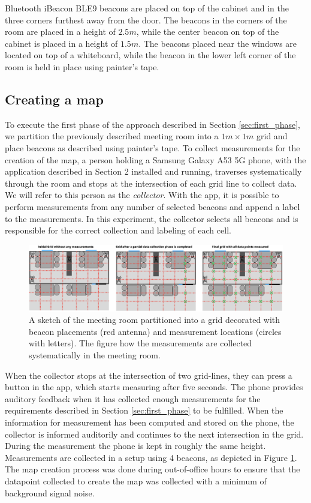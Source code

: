 Bluetooth iBeacon BLE9 beacons \cite{BluetoothiBeaconBLE9} are placed on top of the cabinet and in the three corners furthest away from the door. 
The beacons in the corners of the room are placed in a height of $2.5m$, while the center beacon on top of the cabinet is placed in a height of $1.5m$.   
The beacons placed near the windows are located on top of a whiteboard, while the beacon in the lower left corner of the room is held in place using painter's tape. 


\subsection{Creating a map}
To execute the first phase of the approach described in Section \ref{sec:first_phase},  we partition the previously described meeting room into a $1m \times 1m$ grid and place beacons as described using painter's tape.%
To collect measurements for the creation of the map, a person holding a Samsung Galaxy A53 5G phone, with the application described in Section 2 installed and running, traverses systematically through the room and stops at the intersection of each grid line to collect data. 
We will refer to this person as the \textit{collector}.
With the app, it is possible to perform measurements from any number of selected beacons and append a label to the measurements.
In this experiment, the collector selects all beacons and is responsible for the correct collection and labeling of each cell.
\begin{figure}[h]
    \centering
    \includegraphics[width=\textwidth]{images/experiment_map_creation.png}
    \caption{A sketch of the meeting room partitioned into a grid decorated with beacon placements (red antenna) and measurement locations (circles with letters). The figure how the measurements are collected systematically in the meeting room.}
    \label{fig:experiment_map_creation}
\end{figure}
When the collector stops at the intersection of two grid-lines, they can press a button in the app, which starts measuring after five seconds.
The phone provides auditory feedback when it has collected enough measurements for the requirements described in Section \ref{sec:first_phase} to be fulfilled.
When the information for measurement has been computed and stored on the phone, the collector is informed auditorily and continues to the next intersection in the grid. 
During the measurement the phone is kept in roughly the same height.
Measurements are collected in a setup using 4 beacons, as depicted in Figure \ref{fig:experiment_map_creation}.
The map creation process was done during out-of-office hours to ensure that the datapoint collected to create the map was collected with a minimum of background signal noise.  

